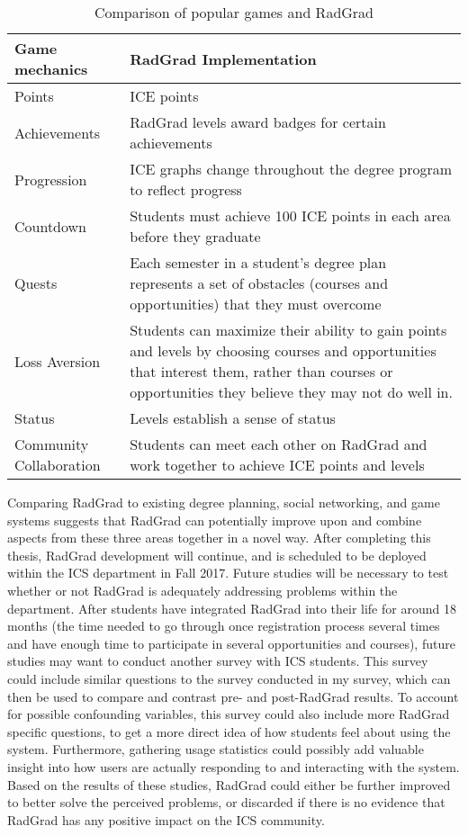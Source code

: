 \begin{table}[htbp!]
\centering
\begin{tabular}{ |p{8cm}|p{8cm}| } 
  \hline
 \textbf{Game mechanics} & \textbf{RadGrad Implementation} \\ 
  \hline
   Points & ICE points \\ 
  \hline
   Achievements &  RadGrad levels award badges for certain achievements\\ 
  \hline
   Progression &  ICE graphs change throughout the degree program to reflect progress\\ 
  \hline
   Countdown & Students must achieve 100 ICE points in each area before they graduate \\ 
  \hline
   Quests & Each semester in a student's degree plan represents a set of obstacles (courses and opportunities) that they must overcome \\ 
  \hline
   Loss Aversion & Students can maximize their ability to gain points and levels by choosing courses and opportunities that interest them, rather than courses or opportunities they believe they may not do well in. \\ 
  \hline
  Status &  Levels establish a sense of status\\ 
  \hline
   Community Collaboration &  Students can meet each other on RadGrad and work together to achieve ICE points and levels\\ 
  \hline

\end{tabular}
 \caption{Comparison of popular games and RadGrad}
  \label{serious-games}
\end{table}


Comparing RadGrad to existing degree planning, social networking, and game systems suggests that RadGrad can potentially improve upon and combine aspects from these three areas together in a novel way. After completing this thesis, RadGrad development will continue, and is scheduled to be deployed within the ICS department in Fall 2017. Future studies will be necessary to test whether or not RadGrad is adequately addressing problems within the department. After students have integrated RadGrad into their life for around 18 months (the time needed to go through once registration process several times and have enough time to participate in several opportunities and courses), future studies may want to conduct another survey with ICS students. This survey could include similar questions to the survey conducted in my survey, which can then be used to compare and contrast pre- and post-RadGrad results. To account for possible confounding variables, this survey could also include more RadGrad specific questions, to get a more direct idea of how students feel about using the system. Furthermore, gathering usage statistics could possibly add valuable insight into how users are actually responding to and interacting with the system. Based on the results of these studies, RadGrad could either be further improved to better solve the perceived problems, or discarded if there is no evidence that RadGrad has any positive impact on the ICS community.

